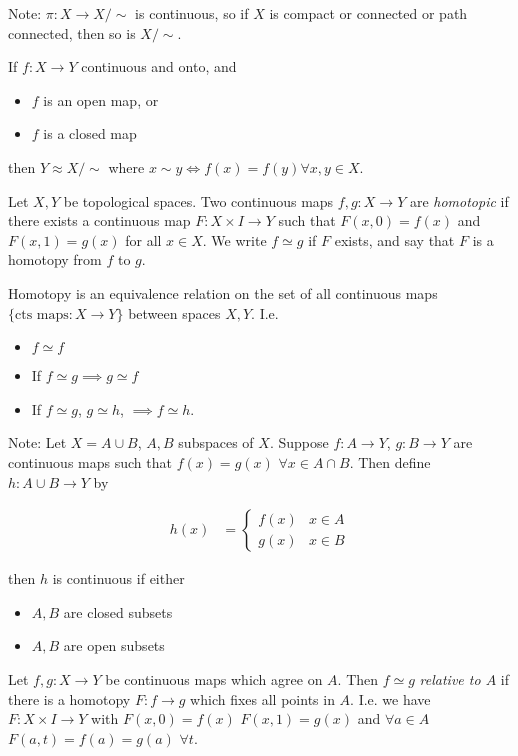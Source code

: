 Note: $\pi:X\to X/\sim$ is continuous, so if $X$ is compact or connected
or path connected, then so is $X/\sim$.
\begin{thm}
If $f:X\to Y$ continuous and onto, and\end{thm}
\begin{itemize}
\item $f$ is an open map, or
\item $f$ is a closed map
\end{itemize}
then $Y\approx X/\sim$ where $x\sim y\Leftrightarrow f(x)=f(y)\forall x,y\in X$.
\begin{defn}
Let $X,Y$ be topological spaces. Two continuous maps $f,g:X\to Y$
are \emph{homotopic} if there exists a continuous map $F:X\times I\to Y$
such that $F(x,0)=f(x)$ and $F(x,1)=g(x)$ for all $x\in X$. We
write $f\simeq g$ if $F$ exists, and say that $F$ is a homotopy
from $f$ to $g$.\end{defn}
\begin{thm}
Homotopy is an equivalence relation on the set of all continuous maps
$\{\text{cts maps}:X\to Y\}$ between spaces $X,Y$. I.e.\end{thm}
\begin{itemize}
\item $f\simeq f$
\item If $f\simeq g\implies g\simeq f$
\item If $f\simeq g$, $g\simeq h$, $\implies f\simeq h$.
\end{itemize}
Note: Let $X=A\cup B$, $A,B$ subspaces of $X$. Suppose $f:A\to Y$,
$g:B\to Y$ are continuous maps such that $f(x)=g(x)$ $\forall x\in A\cap B$.
Then define $h:A\cup B\to Y$ by 

\begin{align*}
h(x) & =\begin{cases}
f(x) & x\in A\\
g(x) & x\in B
\end{cases}
\end{align*}


then $h$ is continuous if either
\begin{itemize}
\item $A,B$ are closed subsets
\item $A,B$ are open subsets\end{itemize}
\begin{defn}
Let $f,g:X\to Y$ be continuous maps which agree on $A$. Then $f\simeq g$
\emph{relative to $A$ }if there is a homotopy $F:f\to g$ which fixes
all points in $A$. I.e. we have $F:X\times I\to Y$ with $F(x,0)=f(x)$
$F(x,1)=g(x)$ and $\forall a\in A$ $F(a,t)=f(a)=g(a)$ $\forall t$.
\end{defn}

